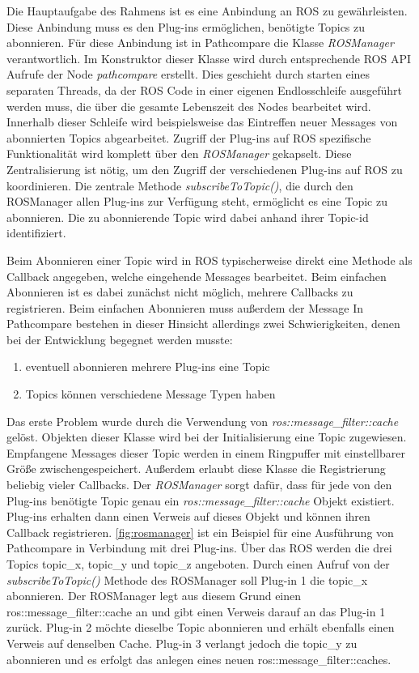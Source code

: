 Die Hauptaufgabe des Rahmens ist es eine Anbindung an ROS zu gewährleisten.
Diese Anbindung muss es den Plug-ins ermöglichen, benötigte Topics zu
abonnieren. Für diese Anbindung ist in Pathcompare die Klasse
\textit{ROSManager} verantwortlich. Im Konstruktor dieser Klasse wird durch
entsprechende ROS API Aufrufe der Node \textit{pathcompare}
erstellt. Dies geschieht durch starten eines separaten Threads, da der ROS Code
in einer eigenen Endlosschleife ausgeführt werden muss, die über die gesamte
Lebenszeit des Nodes bearbeitet wird. Innerhalb dieser Schleife wird
beispielsweise das Eintreffen neuer Messages von abonnierten
Topics abgearbeitet.
Zugriff der Plug-ins auf ROS spezifische Funktionalität wird komplett über den
\textit{ROSManager} gekapselt. Diese Zentralisierung ist nötig, um den Zugriff
der verschiedenen Plug-ins auf ROS zu koordinieren. 
Die zentrale Methode \textit{subscribeToTopic()}, die durch den ROSManager
allen Plug-ins zur Verfügung steht, ermöglicht es eine 
Topic zu abonnieren. Die zu abonnierende Topic wird dabei anhand ihrer
Topic-id identifiziert.


Beim Abonnieren einer Topic wird in ROS typischerweise direkt eine
Methode als Callback angegeben, welche eingehende Messages bearbeitet.
Beim einfachen Abonnieren ist es dabei zunächst nicht möglich, mehrere
Callbacks zu registrieren. Beim einfachen Abonnieren muss außerdem der Message
In Pathcompare bestehen in dieser Hinsicht allerdings zwei
Schwierigkeiten, denen bei der Entwicklung begegnet werden musste:

\begin{enumerate}
  \item eventuell abonnieren mehrere Plug-ins eine Topic
  \item Topics können verschiedene Message Typen haben
\end{enumerate}

Das erste Problem wurde durch die Verwendung von
\textit{ros::message\_filter::cache} gelöst. Objekten dieser Klasse wird bei der
Initialisierung eine Topic zugewiesen. Empfangene Messages
dieser Topic werden in einem Ringpuffer mit einstellbarer Größe
zwischengespeichert.  Außerdem erlaubt diese Klasse die Registrierung beliebig
vieler Callbacks.  Der \textit{ROSManager} sorgt dafür, dass für jede von
den Plug-ins benötigte Topic genau ein
\textit{ros::message\_filter::cache} Objekt existiert. Plug-ins erhalten dann
einen Verweis auf dieses Objekt und können ihren Callback registrieren.
\autoref{fig:rosmanager} ist ein Beispiel für eine Ausführung von Pathcompare
in Verbindung mit drei Plug-ins. Über das ROS werden die drei Topics topic\_x,
topic\_y und topic\_z angeboten. Durch einen Aufruf von der
\textit{subscribeToTopic()} Methode
des ROSManager soll Plug-in 1 die topic\_x abonnieren. Der ROSManager legt aus
diesem Grund einen ros::message\_filter::cache an und gibt einen Verweis darauf
an das Plug-in 1 zurück.
Plug-in 2 möchte dieselbe Topic abonnieren und erhält ebenfalls einen
Verweis auf denselben Cache. Plug-in 3 verlangt jedoch die topic\_y zu
abonnieren und es erfolgt das anlegen eines neuen ros::message\_filter::caches. 

